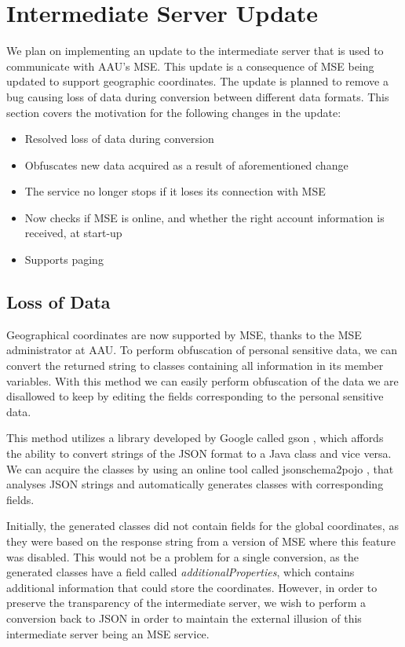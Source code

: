 \section{Intermediate Server Update}\label{sec:proxy_update1}
We plan on implementing an update to the intermediate server that is used to communicate with AAU's MSE. This update is a consequence of MSE being updated to support geographic coordinates. The update is planned to remove a bug causing loss of data during conversion between different data formats. This section covers the motivation for the following changes in the update:

\begin{itemize}
\item Resolved loss of data during conversion
\item Obfuscates new data acquired as a result of aforementioned change
\item The service no longer stops if it loses its connection with MSE
\item Now checks if MSE is online, and whether the right account information is received, at start-up
\item Supports paging
\end{itemize}

\subsection*{Loss of Data}
Geographical coordinates are now supported by MSE, thanks to the MSE administrator at AAU. To perform obfuscation of personal sensitive data, we can convert the returned string to classes containing all information in its member variables. With this method we can easily perform obfuscation of the data we are disallowed to keep by editing the fields corresponding to the personal sensitive data.

This method utilizes a library developed by Google called gson \cite{gson}, which affords the ability to convert strings of the JSON format to a Java class and vice versa. We can acquire the classes by using an online tool called jsonschema2pojo \cite{jsonschematwopojo}, that analyses JSON strings and automatically generates classes with corresponding fields.

Initially, the generated classes did not contain fields for the global coordinates, as they were based on the response string from a version of MSE where this feature was disabled. This would not be a problem for a single conversion, as the generated classes have a field called \textit{additionalProperties}, which contains additional information that could store the coordinates. However, in order to preserve the transparency of the intermediate server, we wish to perform a conversion back to JSON in order to maintain the external illusion of this intermediate server being an MSE service.

